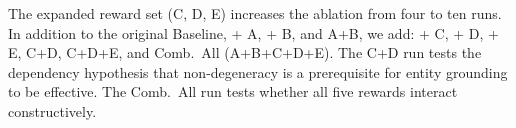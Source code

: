 The expanded reward set (C, D, E) increases the ablation from four to ten runs.
In addition to the original Baseline, + A, + B, and A+B, we add: + C, + D, + E, C+D, C+D+E, and Comb.\ All (A+B+C+D+E).
The C+D run tests the dependency hypothesis that non-degeneracy is a prerequisite for entity grounding to be effective.
The Comb.\ All run tests whether all five rewards interact constructively.
